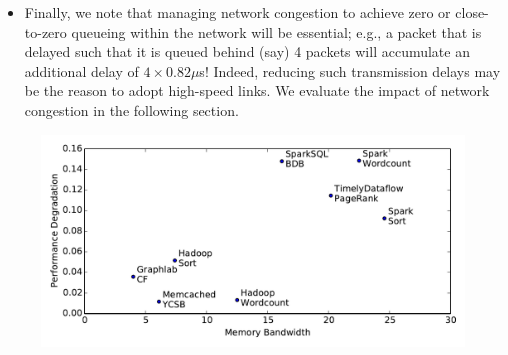 \begin{itemize}[leftmargin=*]
	\item Finally, we note that managing network congestion to achieve zero or close-to-zero queueing within the network will be essential; e.g., a packet that is delayed such that it is queued behind (say) 4 packets will accumulate an additional delay of $4\times0.82\mu$s! 
	Indeed, reducing such transmission delays may be the reason to adopt high-speed links. We evaluate the impact of network congestion in the following section.

\end{itemize} 

\begin{figure}
  \centering
    \includegraphics[width=\columnwidth]{img/mem_bandwidth.pdf} 
    \caption{\small{}}
  \label{fig:memband}
\end{figure}

